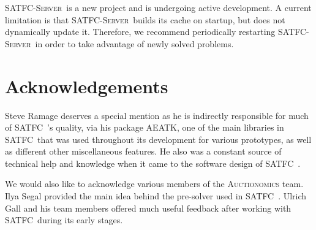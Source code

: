 \documentclass[
10pt, %
letterpaper, %
oneside, %
headinclude,footinclude, %
BCOR5mm, %
needspace, %
]{scrartcl}
\newcommand{\SATFC}{\textsc{SATFC}~}
\newcommand{\SATFCServer}{\textsc{SATFC-Server}~}
\newcommand{\AEATK}{\textsc{AEATK}}
\begin{document}
\begin{fwarning}
	\SATFCServer is a new project and is undergoing active development. A current limitation is that \SATFCServer builds its cache on startup, but does not dynamically update it. Therefore, we recommend periodically restarting \SATFCServer in order to take advantage of newly solved problems.
\end{fwarning}


\section{Acknowledgements} 

Steve Ramage deserves a special mention as he is indirectly responsible for much of \SATFC's quality, via his package \AEATK, one of the main libraries in \SATFC that was used throughout its development for various prototypes, as well as different other miscellaneous features. He also was a constant source of technical help and knowledge when it came to the software design of \SATFC.

We would also like to acknowledge various members of the \textsc{Auctionomics} team. Ilya Segal provided the main idea behind the pre-solver used in \SATFC. Ulrich Gall and his team members offered much useful feedback after working with \SATFC during its early stages.
\end{document}
